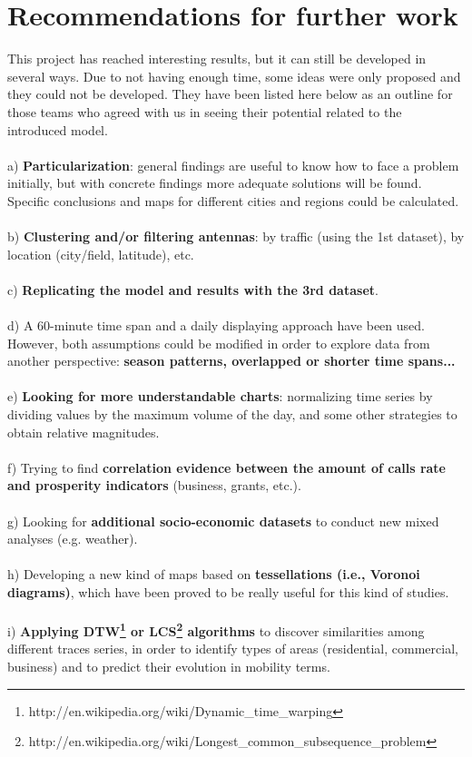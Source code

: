 \newpage
\section{Recommendations for further work}

This project has reached interesting results, but it can still be developed in several ways. Due to not having enough time, some ideas were only proposed and they could not be developed. They have been listed here below as an outline for those teams who agreed with us in seeing their potential related to the introduced model.
\\
\\
a) {\bf Particularization}: general findings are useful to know how to face a problem initially, but with concrete findings more adequate solutions will be found. Specific conclusions and maps for different cities and regions could be calculated.
\\
\\
b) {\bf Clustering and/or filtering antennas}: by traffic (using the 1st dataset), by location (city/field, latitude), etc.
\\
\\
c) {\bf Replicating the model and results with the 3rd dataset}.
\\
\\
d) A 60-minute time span and a daily displaying approach have been used. However, both assumptions could be modified in order to explore data from another perspective: {\bf season patterns, overlapped or shorter time spans...}
\\
\\
e) {\bf Looking for more understandable charts}: normalizing time series by dividing values by the maximum volume of the day, and some other strategies to obtain relative magnitudes.
\\
\\
f) Trying to find {\bf correlation evidence between the amount of calls rate and prosperity indicators} (business, grants, etc.).
\\
\\
g) Looking for {\bf additional socio-economic datasets} to conduct new mixed analyses (e.g. weather).
\\
\\
h) Developing a new kind of maps based on {\bf tessellations (i.e., Voronoi diagrams)}, which have been proved to be really useful for this kind of studies.
\\
\\
i) {\bf Applying DTW\footnote{http://en.wikipedia.org/wiki/Dynamic\_time\_warping} or LCS\footnote{http://en.wikipedia.org/wiki/Longest\_common\_subsequence\_problem} algorithms} to discover similarities among different traces series, in order to identify types of areas (residential, commercial, business) and to predict their evolution in mobility terms.
